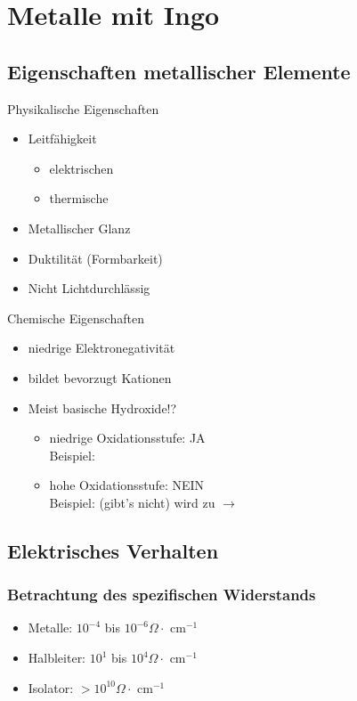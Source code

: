 \documentclass{article}
\begin{document}
\section{Metalle mit Ingo}
\subsection{Eigenschaften metallischer Elemente}
Physikalische Eigenschaften
\begin{itemize}
    \item Leitfähigkeit
    \begin{itemize}
        \item elektrischen
        \item thermische
    \end{itemize}
    \item Metallischer Glanz
    \item Duktilität (Formbarkeit)
    \item Nicht Lichtdurchlässig
\end{itemize}
Chemische Eigenschaften
\begin{itemize}
    \item niedrige Elektronegativität
    \item bildet bevorzugt Kationen
    \item Meist basische Hydroxide!?
    \begin{itemize}
        \item niedrige Oxidationsstufe: JA \\Beispiel: 
        \item hohe Oxidationsstufe: NEIN \\Beispiel:  (gibt's nicht) wird zu  $\rightarrow$\\ 
    \end{itemize}
\end{itemize}
\subsection{Elektrisches Verhalten}
\subsubsection{Betrachtung des spezifischen Widerstands}
\begin{itemize}
    \item Metalle: $10^{-4}$ bis $10^{-6} \Omega\cdot$ cm$^{-1}$
    \item Halbleiter: $10^{1}$ bis $10^{4} \Omega\cdot$ cm$^{-1}$
    \item Isolator: $> 10^{10} \Omega\cdot$ cm$^{-1}$
\end{itemize}
\end{document}
